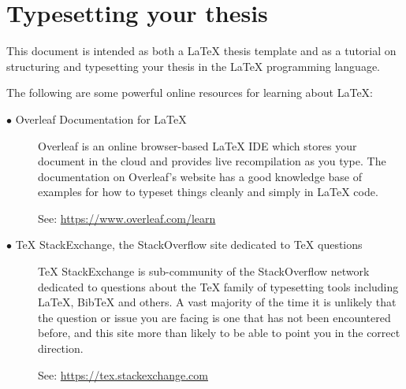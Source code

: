 \chapter{Typesetting your thesis}
	\label{chap:typesetting}
	
	This document is intended as both a LaTeX thesis template and as a tutorial on structuring and typesetting your thesis in the LaTeX programming language.
	
	The following are some powerful online resources for learning about LaTeX:
	
	\begin{description}	
			
		\item[$\bullet$ Overleaf Documentation for LaTeX]\hfill
		
		Overleaf \cite{overleafdocs} is an online browser-based LaTeX IDE which stores your document in the cloud and provides live recompilation as you type. The documentation on Overleaf's website has a good knowledge base of examples for how to typeset things cleanly and simply in LaTeX code. 
		
		\noindent See: {\small \url{https://www.overleaf.com/learn}}
		
		\item[$\bullet$ TeX StackExchange, the StackOverflow site dedicated to TeX questions]\hfill
		
		TeX StackExchange \cite{texstackexchange} is sub-community of the StackOverflow network dedicated to questions about the TeX family of typesetting tools including LaTeX, BibTeX and others. A vast majority of the time it is unlikely that the question or issue you are facing is one that has not been encountered before, and this site more than likely to be able to point you in the correct direction. 
		
		\noindent See: {\small \url{https://tex.stackexchange.com}}
		
	\end{description}
	
	\newpage 
		
